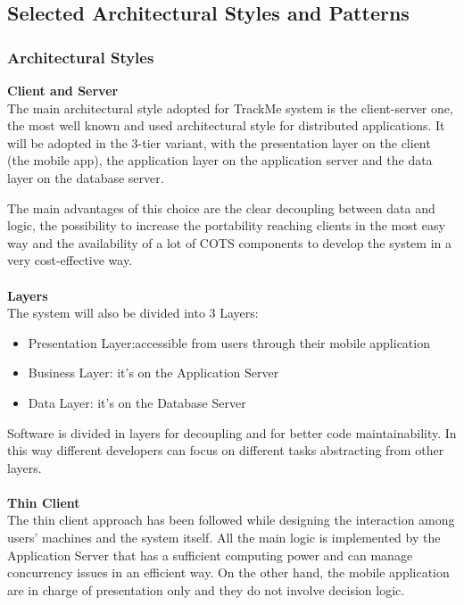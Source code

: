 \clearpage

\subsection{Selected Architectural Styles and Patterns}
\subsubsection{Architectural Styles}
\textbf{Client and Server}\\

The main architectural style adopted for TrackMe system is the client-server one, the most well known and used architectural style for distributed applications. It will be adopted in the 3-tier variant, with the presentation layer on the client (the mobile app), the application layer on the application server and the data layer on the database server.

The main advantages of this choice are the clear decoupling between data and logic, the possibility to increase the portability reaching clients in the most easy way and the availability of a lot of COTS components to  develop the system in a very cost-effective way.\\
\\
\textbf{Layers}\\

The system will also be divided into 3 Layers:
\begin{itemize}
\item Presentation Layer:accessible from users through their mobile application
\item Business Layer: it's on the Application Server
\item Data Layer: it's on the Database Server
\end{itemize}
Software is divided in layers for decoupling and for better code maintainability. In this way different developers can focus on different tasks abstracting from other layers.\\
\\
\textbf{Thin Client}\\

The thin client approach has been followed while designing the interaction among users’ machines and the system itself. All the main logic is implemented by the Application Server that has a sufficient computing power and can manage concurrency issues in an efficient way. On the other hand, the mobile application are in charge of presentation only and they do not involve decision logic.

